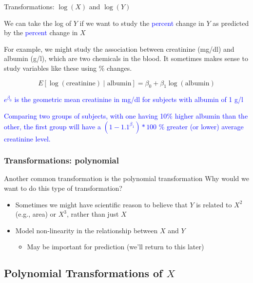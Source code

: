 \documentclass[10pt,t]{beamer}
\begin{document}
\begin{frame}{Transformations: $\log(X)$ and $\log(Y)$}
	
	\vspace{-5 mm}
	
		We can take the log of $Y$ if we want to study the \textcolor{blue}{percent} change in $Y$ as predicted by the \textcolor{blue}{percent} change in $X$
	\medskip
	
	For example, we might study the association between creatinine (mg/dl) and  albumin (g/l), which are two chemicals in the blood. It sometimes makes sense to study variables like these using \% changes. 

		$$
		E[\log(\text{creatinine}) \mid \text{albumin}] = \beta_0 + \beta_1 \log(\text{albumin})
		$$
		\smallskip
		
		\textcolor{blue}{$e^{\beta_0}$ is the geometric mean creatinine in mg/dl for subjects with albumin of 1 g/l} 
		\medskip
		
		\textcolor{blue}{Comparing two groups of subjects, with one having 10\% higher albumin than the other, the first group will have a $(1-1.1^{\beta_1})*100$ \% greater (or lower) average creatinine level.}
	
	
\end{frame}





\begin{frame}
\frametitle{Transformations: polynomial}
Another common transformation is the polynomial transformation
\medskip
Why would we want to do this type of transformation?
\medskip
\begin{itemize}
	\item Sometimes we might have scientific reason to believe that $Y$ is related to $X^2$ (e.g., area) or $X^3$, rather than just $X$
	\medskip
	\item Model non-linearity in the relationship between $X$ and $Y$
	\begin{itemize}
		\medskip
		\item May be important for prediction (we'll return to this later)
	\end{itemize}
\end{itemize}

\end{frame}

\subsection{Polynomial Transformations of $X$}
\end{document}
